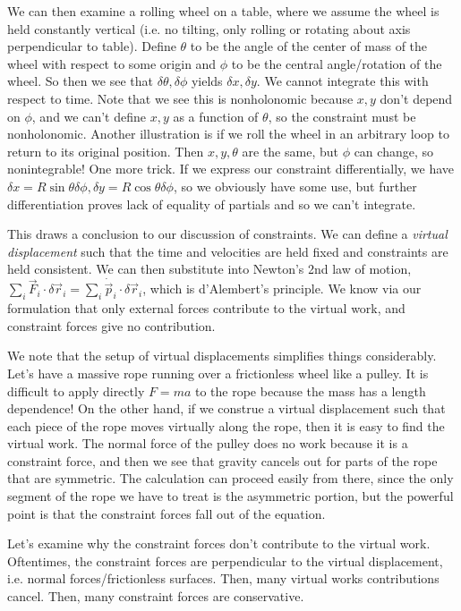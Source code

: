 \documentclass[10pt]{report}
\begin{document}
We can then examine a rolling wheel on a table, where we assume the wheel is held constantly vertical (i.e. no tilting, only rolling or rotating about axis perpendicular to table). Define $\theta$ to be the angle of the center of mass of the wheel with respect to some origin and $\phi$ to be the central angle/rotation of the wheel. So then we see that $\delta \theta, \delta \phi$ yields $\delta x, \delta y$. We cannot integrate this with respect to time. Note that we see this is nonholonomic because $x,y$ don't depend on $\phi$, and we can't define $x,y$ as a function of $\theta$, so the constraint must be nonholonomic. Another illustration is if we roll the wheel in an arbitrary loop to return to its original position. Then $x,y,\theta$ are the same, but $\phi$ can change, so nonintegrable! One more trick. If we express our constraint differentially, we have $\delta x = R\sin\theta \delta\phi, \delta y = R\cos \theta \delta \phi$, so we obviously have some use, but further differentiation proves lack of equality of partials and so we can't integrate.

This draws a conclusion to our discussion of constraints. We can define a \emph{virtual displacement} such that the time and velocities are held fixed and constraints are held consistent. We can then substitute into Newton's 2nd law of motion, $\sum_i \vec{F}_i\cdot \delta\vec{r}_i = \sum_i \dot{\vec{p}}_i \cdot \delta\vec{r}_i$, which is d'Alembert's principle. We know via our formulation that only external forces contribute to the virtual work, and constraint forces give no contribution. 

We note that the setup of virtual displacements simplifies things considerably. Let's have a massive rope running over a frictionless wheel like a pulley. It is difficult to apply directly $F=ma$ to the rope because the mass has a length dependence! On the other hand, if we construe a virtual displacement such that each piece of the rope moves virtually along the rope, then it is easy to find the virtual work. The normal force of the pulley does no work because it is a constraint force, and then we see that gravity cancels out for parts of the rope that are symmetric. The calculation can proceed easily from there, since the only segment of the rope we have to treat is the asymmetric portion, but the powerful point is that the constraint forces fall out of the equation.

Let's examine why the constraint forces don't contribute to the virtual work. Oftentimes, the constraint forces are perpendicular to the virtual displacement, i.e. normal forces/frictionless surfaces. Then, many virtual works contributions cancel. Then, many constraint forces are conservative. 
\end{document}
